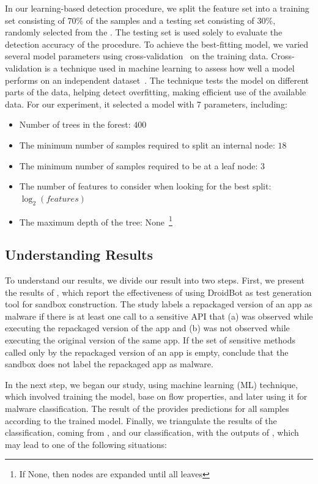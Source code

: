 In our learning-based detection procedure, we split the feature set into a training set consisting of $70$\% of the samples and a testing set consisting of $30$\%, randomly selected from the \cds. The testing set is used solely to evaluate the detection accuracy of the procedure. To achieve the best-fitting model, we varied several model parameters using cross-validation~\cite{DBLP:phd/us/Stephenson22} on the training data. Cross-validation is a technique used in machine learning to assess how well a model performs on an independent dataset~\cite{DBLP:journals/jsan/AwadF23}. The technique tests the model on different parts of the data, helping detect overfitting, making efficient use of the available data. For our experiment, it selected a model with 7 parameters, including:

\begin{itemize}
    \item Number of trees in the forest: $400$
    \item The minimum number of samples required to split an internal node: $18$
    \item The minimum number of samples required to be at a leaf node: $3$
    \item The number of features to consider when looking for the best split: $\log_2(features)$
    \item The maximum depth of the tree: None~\footnote{If None, then nodes are expanded until all leaves}
\end{itemize}

\subsection{Understanding Results}\label{sec:understand}

To understand our results, we divide our result into two steps. First, we present the results of \fhc, which report the effectiveness of \mas using DroidBot as test generation tool for sandbox construction. The study labels a repackaged version of an app as malware if there is at least one call to a sensitive API that (a) was observed while executing the repackaged version of the app and (b) was not observed while executing the original version of the same app. If the set of sensitive methods called only by the repackaged version of an app is empty,  \fhc conclude that the sandbox does not label the repackaged app as malware.

In the next step, we began our study, using machine learning (ML) technique, which involved training the model, base on flow properties, and later using it for malware classification. The result of the \ml provides predictions for all samples according to the trained model. Finally, we triangulate the results of the \mas classification, coming from \fhc, and our \ml classification, with the outputs of \vt, which may lead to one of the following situations:

